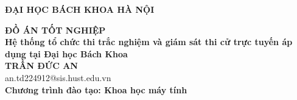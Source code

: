 \documentclass[DoAn.tex]{subfiles}
\begin{document}
\begin{titlepage}
\thispagestyle{empty}
\begin{center}

{\textbf{\large{ĐẠI HỌC BÁCH KHOA HÀ NỘI}}}

\vfill

{\textbf{\huge{ ĐỒ ÁN TỐT NGHIỆP}}}\\[1cm]
\textbf{\Large Hệ thống tổ chức thi trắc nghiệm và giám sát thi cử trực tuyến áp dụng tại Đại học Bách Khoa}\\[1cm]

{\textbf{\large{TRẦN ĐỨC AN}}}\\
{\large{an.td224912@sis.hust.edu.vn}}\\[0.5cm]

{\textbf{\large{Chương trình đào tạo: Khoa học máy tính
}}}\\

\vfill

\begin{table}[H]
\centering
{}
\end{table}
\end{center}



\end{titlepage}
\end{document}
